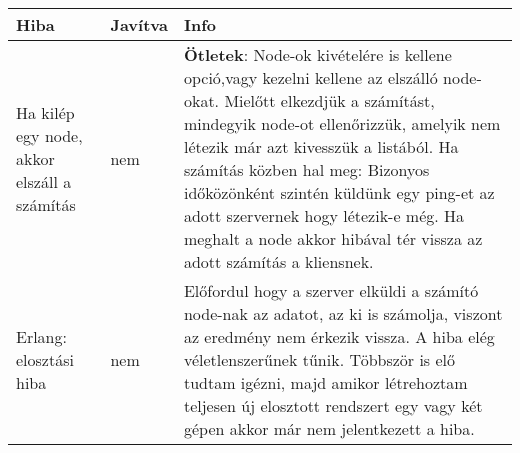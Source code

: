   	\begin{center}\begin{tabular}{| p{4cm} | p{1.5cm} | p{8cm} |}
	\hline Hiba & Javítva & Info 
    \\ \hline
        Ha kilép egy node, akkor elszáll a számítás 
      &
      	nem
      &
      \textbf{Ötletek}:
      Node-ok kivételére is kellene opció,vagy kezelni kellene az elszálló node-okat.
      \newline Mielőtt elkezdjük a számítást, mindegyik node-ot ellenőrizzük, amelyik nem létezik már azt kivesszük a listából. Ha számítás közben hal meg: Bizonyos időközönként szintén küldünk egy ping-et az adott szervernek hogy létezik-e még. Ha meghalt a node akkor hibával tér vissza az adott számítás a kliensnek.
   	\\ \hline
    	Erlang: elosztási hiba
      &
      	nem
      &
      	Előfordul hogy a szerver elküldi a számító node-nak az adatot, az ki is számolja, viszont az eredmény nem érkezik vissza.\newline
      	A hiba elég véletlenszerűnek tűnik. Többször is elő tudtam igézni, majd amikor létrehoztam teljesen új elosztott rendszert egy vagy két gépen akkor már nem jelentkezett a hiba. 
    \\ \hline
  	\end{tabular}\end{center}
